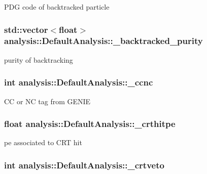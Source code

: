 P\-D\-G code of backtracked particle \hypertarget{classanalysis_1_1DefaultAnalysis_ad08d9b30c434685e350c5f292d4df08b}{
\subsubsection[{\-\_\-backtracked\-\_\-purity}]{\setlength{\rightskip}{0pt plus 5cm}std\-::vector$<$float$>$ analysis\-::\-Default\-Analysis\-::\-\_\-backtracked\-\_\-purity\hspace{0.3cm}{\ttfamily [private]}}}\label{classanalysis_1_1DefaultAnalysis_ad08d9b30c434685e350c5f292d4df08b}
purity of backtracking \hypertarget{classanalysis_1_1DefaultAnalysis_ac2df5c78c8d06e090d0b6cd195fa83d8}{
\subsubsection[{\-\_\-ccnc}]{\setlength{\rightskip}{0pt plus 5cm}int analysis\-::\-Default\-Analysis\-::\-\_\-ccnc\hspace{0.3cm}{\ttfamily [private]}}}\label{classanalysis_1_1DefaultAnalysis_ac2df5c78c8d06e090d0b6cd195fa83d8}
C\-C or N\-C tag from G\-E\-N\-I\-E \hypertarget{classanalysis_1_1DefaultAnalysis_a900ec35e3ca4a00d4625a1e632bb6b40}{
\subsubsection[{\-\_\-crthitpe}]{\setlength{\rightskip}{0pt plus 5cm}float analysis\-::\-Default\-Analysis\-::\-\_\-crthitpe\hspace{0.3cm}{\ttfamily [private]}}}\label{classanalysis_1_1DefaultAnalysis_a900ec35e3ca4a00d4625a1e632bb6b40}
pe associated to C\-R\-T hit \hypertarget{classanalysis_1_1DefaultAnalysis_a84ce9904fa527012a65c2be203a38d38}{
\subsubsection[{\-\_\-crtveto}]{\setlength{\rightskip}{0pt plus 5cm}int analysis\-::\-Default\-Analysis\-::\-\_\-crtveto\hspace{0.3cm}{\ttfamily [private]}}}\label{classanalysis_1_1DefaultAnalysis_a84ce9904fa527012a65c2be203a38d38}

